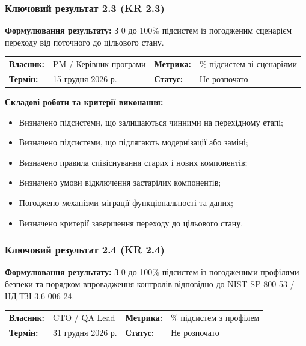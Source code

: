\documentclass{article}
\begin{document}
\subsubsection{Ключовий результат 2.3 (KR 2.3)}

\textbf{Формулювання результату:} З 0 до 100\% підсистем із погодженим сценарієм переходу від поточного до цільового стану.

\noindent\begin{tabular}{@{}p{2.2cm}p{4.5cm}p{2.2cm}p{4.5cm}@{}}
\toprule
\textbf{Власник:} & PM / Керівник програми & \textbf{Метрика:} & \% підсистем зі сценаріями \\
\textbf{Термін:} & 15 грудня 2026 р. & \textbf{Статус:} & Не розпочато \\
\bottomrule
\end{tabular}

\vspace{10pt}
\textbf{Складові роботи та критерії виконання:}
\begin{itemize}
    \item Визначено підсистеми, що залишаються чинними на перехідному етапі;
    \item Визначено підсистеми, що підлягають модернізації або заміні;
    \item Визначено правила співіснування старих і нових компонентів;
    \item Визначено умови відключення застарілих компонентів;
    \item Погоджено механізми міграції функціональності та даних;
    \item Визначено критерії завершення переходу до цільового стану.
\end{itemize}

\subsubsection{Ключовий результат 2.4 (KR 2.4)}

\textbf{Формулювання результату:} З 0 до 100\% підсистем із погодженими профілями безпеки та порядком впровадження контролів відповідно до NIST SP 800-53 / НД ТЗІ 3.6-006-24.

\noindent\begin{tabular}{@{}p{2.2cm}p{4.5cm}p{2.2cm}p{4.5cm}@{}}
\toprule
\textbf{Власник:} & CTO / QA Lead & \textbf{Метрика:} & \% підсистем з профілем \\
\textbf{Термін:} & 31 грудня 2026 р. & \textbf{Статус:} & Не розпочато \\
\bottomrule
\end{tabular}
\end{document}
